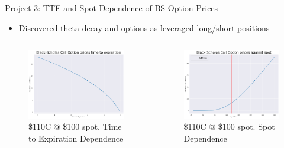 \documentclass[presentation]{beamer}
\begin{document}
\begin{frame}[label={sec:org5184bb1}]{Project 3: TTE and Spot Dependence of BS Option Prices}
\begin{itemize}
\item Discovered \alert{theta decay} and options as \alert{leveraged long/short positions}
\end{itemize}
\begin{columns}
\begin{column}{0.5\columnwidth}
\begin{figure}[htbp]
\centering
\includegraphics[width=.9\linewidth]{./figures/bc-call-tte.png}
\caption{\$110C @ \$100 spot. Time to Expiration Dependence}
\end{figure}
\end{column}
\begin{column}{0.5\columnwidth}
\begin{figure}[htbp]
\centering
\includegraphics[width=.9\linewidth]{./figures/bc-call-spot.png}
\caption{\$110C @ \$100 spot. Spot Dependence}
\end{figure}
\end{column}
\end{columns}
\end{frame}
\end{document}
